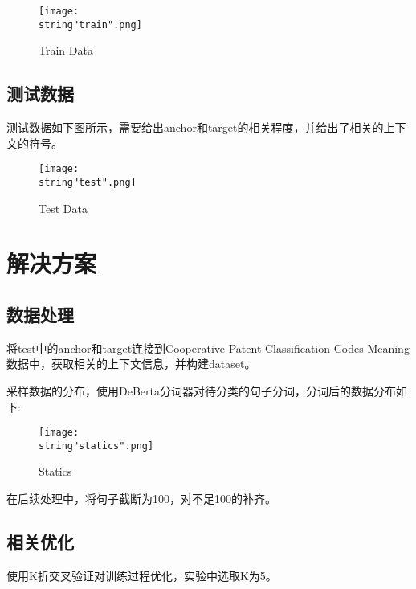 \documentclass[UTF8]{ctexart}
\begin{document}
\begin{figure}[H]
    \begin{center}
        \texttt{[image: \\string"train".png]}
    \caption{Train Data}
    \label{fig:2}
    \end{center}
    \end{figure}
\par

\subsection{测试数据}
测试数据如下图所示，需要给出anchor和target的相关程度，并给出了相关的上下文的符号。\par 
\begin{figure}[H]
    \begin{center}
        \texttt{[image: \\string"test".png]}
    \caption{Test Data}
    \label{fig:3}
    \end{center}
    \end{figure}
\par

\section{解决方案}
\subsection{数据处理}
将test中的anchor和target连接到Cooperative Patent Classification Codes Meaning数据中，获取相关的上下文信息，并构建dataset。\par 
采样数据的分布，使用DeBerta分词器对待分类的句子分词，分词后的数据分布如下:\par 
\begin{figure}[H]
    \begin{center}
        \texttt{[image: \\string"statics".png]}
    \caption{Statics}
    \label{fig:4}
    \end{center}
    \end{figure}
\par
在后续处理中，将句子截断为100，对不足100的补齐。\par 

\subsection{相关优化}
使用K折交叉验证对训练过程优化，实验中选取K为5。
\end{document}
